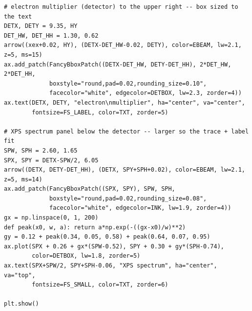\begin{lstlisting}[caption={schematics.ipynb code cell 1},label={lst:mrl-nb-schematics-1}]
# electron multiplier (detector) to the upper right -- box sized to the text
DETX, DETY = 9.35, HY
DET_HW, DET_HH = 1.30, 0.62
arrow((xex+0.02, HY), (DETX-DET_HW-0.02, DETY), color=EBEAM, lw=2.1, z=5, ms=15)
ax.add_patch(FancyBboxPatch((DETX-DET_HW, DETY-DET_HH), 2*DET_HW, 2*DET_HH,
             boxstyle="round,pad=0.02,rounding_size=0.10",
             facecolor="white", edgecolor=DETBOX, lw=2.3, zorder=4))
ax.text(DETX, DETY, "electron\nmultiplier", ha="center", va="center",
        fontsize=FS_LABEL, color=TXT, zorder=5)

# XPS spectrum panel below the detector -- larger so the trace + label fit
SPW, SPH = 2.60, 1.65
SPX, SPY = DETX-SPW/2, 6.05
arrow((DETX, DETY-DET_HH), (DETX, SPY+SPH+0.02), color=EBEAM, lw=2.1, z=5, ms=14)
ax.add_patch(FancyBboxPatch((SPX, SPY), SPW, SPH,
             boxstyle="round,pad=0.02,rounding_size=0.08",
             facecolor="white", edgecolor=INK, lw=1.9, zorder=4))
gx = np.linspace(0, 1, 200)
def peak(x0, w, a): return a*np.exp(-((gx-x0)/w)**2)
gy = 0.12 + peak(0.34, 0.05, 0.58) + peak(0.64, 0.07, 0.95)
ax.plot(SPX + 0.26 + gx*(SPW-0.52), SPY + 0.30 + gy*(SPH-0.74),
        color=DETBOX, lw=1.8, zorder=5)
ax.text(SPX+SPW/2, SPY+SPH-0.06, "XPS spectrum", ha="center", va="top",
        fontsize=FS_SMALL, color=TXT, zorder=6)

plt.show()
\end{lstlisting}


